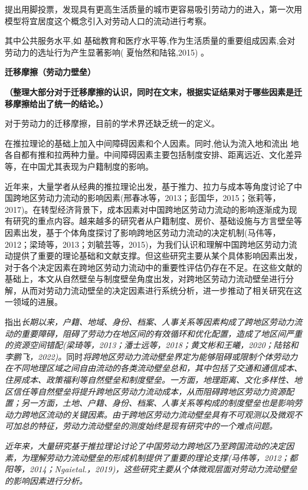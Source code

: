 \documentclass[a4paper,12pt]{article}
\begin{document}
\cite{tieboutPureTheoryLocal1956}提出用脚投票，发现具有更高生活质量的城市更容易吸引劳动力的进入，第一次用模型将宜居度这个概念引入对劳动人口的流动进行考察。

其中公共服务水平,如 基础教育和医疗水平等,作为生活质量的重要组成因素,会对劳动力的选址行为产生显著影响( 夏怡然和陆铭,2015) 。

\textbf{迁移摩擦（劳动力壁垒）}

\textbf{（整理大部分对于迁移摩擦的认识，同时在文末，根据实证结果对于哪些因素是迁移摩擦给出了统一的结论。）}

对于劳动力的迁移摩擦，目前的学术界还缺乏统一的定义。

\cite{leeTheoryMigration1966}在推拉理论的基础上加入中间障碍因素和个人因素。同时,他认为流入地和流出  地各自都有推和拉两种力量。中间障碍因素主要包括制度安排、距离远近、文化差异等，在中国尤其表现为户籍制度的影响。

近年来，大量学者从经典的推拉理论出发，基于推力、拉力与成本等角度讨论了中国跨地区劳动力流动的影响因素(邢春冰等，2013；彭国华，2015；张莉等，2017)。在转型经济背景下，成本因素对中国跨地区劳动力流动的影响逐渐成为现有研究的重点内容。越来越多的研究者从户籍制度、房价、基础设施与方言壁垒等因素出发，基于个体角度探讨了影响跨地区劳动力流动的决定机制(马伟等，2012；梁琦等，2013；刘毓芸等，2015)，为我们认识和理解中国跨地区劳动力流动提供了重要的理论基础和文献支撑。但这些研究主要从某个具体影响因素出发，对于各个决定因素在跨地区劳动力流动中的重要性评估仍存在不足。在这些文献的基础上，本文从自然壁垒与制度壁垒角度出发，对跨地区劳动力流动壁垒进行分解，从而对劳动力流动壁垒的决定因素进行系统分析，进一步推动了相关研究在这一领域的进展。

\cite{JiangWeiZhongGuoKuaDiQuLaoDongLiLiuDongBiLeiCeDuFangFaYanJinQuShiYuJueDingYinSu2024}指出\textit{长期以来，户籍、地域、身份、档案、人事关系等因素构成了跨地区劳动力流动的重要障碍，阻碍了劳动力在地区间的有效循环和优化配置，造成了地区间严重的资源空间错配(梁琦等，2013；潘士远等，2018；黄文彬和王曦，2020；陆铭和李鹏飞，2022)。}同时\textit{将跨地区劳动力流动壁垒界定为能够阻碍或限制个体劳动力在不同地理区域之间自由流动的各类流动壁垒总和，其中包括了交通和通信成本、住房成本、政策福利等自然壁垒和制度壁垒。一方面，地理距离、文化多样性、地区信任等自然壁垒将提升跨地区劳动力流动成本，从而阻碍跨地区劳动力资源配置；另一方面，土地、户籍、身份、档案、人事关系等构成的制度壁垒也是影响劳动力跨地区流动的关键因素。由于跨地区劳动力流动壁垒具有不可观测以及微观不可加总的特征，劳动力流动壁垒的测度始终是现有研究中的一个难点问题。}

\textit{近年来，大量研究基于推拉理论讨论了中国劳动力跨地区乃至跨国流动的决定因素，为理解劳动力流动壁垒的形成机制提供了重要的理论支撑(马伟等，2012；都阳等，2014；Ngaietal.，2019)，这些研究主要从个体微观层面对劳动力流动壁垒的影响因素进行分析。}
\end{document}
